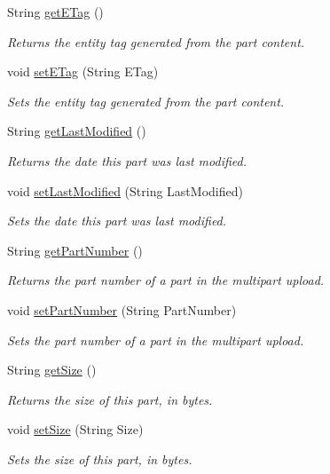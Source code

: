 \begin{DoxyCompactItemize}
\item 
String \hyperlink{classorg_1_1jcs_1_1dss_1_1main_1_1PartSummary_a02242db1df4b063bb74e890017a0542c}{get\+E\+Tag} ()
\begin{DoxyCompactList}\small\item\em Returns the entity tag generated from the part content. \end{DoxyCompactList}\item 
void \hyperlink{classorg_1_1jcs_1_1dss_1_1main_1_1PartSummary_a30882b2d780f87e0925003d497a2e2e0}{set\+E\+Tag} (String E\+Tag)
\begin{DoxyCompactList}\small\item\em Sets the entity tag generated from the part content. \end{DoxyCompactList}\item 
String \hyperlink{classorg_1_1jcs_1_1dss_1_1main_1_1PartSummary_a1688671174df7b92a7244e429004b211}{get\+Last\+Modified} ()
\begin{DoxyCompactList}\small\item\em Returns the date this part was last modified. \end{DoxyCompactList}\item 
void \hyperlink{classorg_1_1jcs_1_1dss_1_1main_1_1PartSummary_a285cc3cbb9df94da270f65543b51fce9}{set\+Last\+Modified} (String Last\+Modified)
\begin{DoxyCompactList}\small\item\em Sets the date this part was last modified. \end{DoxyCompactList}\item 
String \hyperlink{classorg_1_1jcs_1_1dss_1_1main_1_1PartSummary_ad67c10b3a48cbaee701cfb71f3b94b16}{get\+Part\+Number} ()
\begin{DoxyCompactList}\small\item\em Returns the part number of a part in the multipart upload. \end{DoxyCompactList}\item 
void \hyperlink{classorg_1_1jcs_1_1dss_1_1main_1_1PartSummary_a862ffbd749521c759a5122742b6de395}{set\+Part\+Number} (String Part\+Number)
\begin{DoxyCompactList}\small\item\em Sets the part number of a part in the multipart upload. \end{DoxyCompactList}\item 
String \hyperlink{classorg_1_1jcs_1_1dss_1_1main_1_1PartSummary_ad0e537953c477eef5e63c8ae8efe1410}{get\+Size} ()
\begin{DoxyCompactList}\small\item\em Returns the size of this part, in bytes. \end{DoxyCompactList}\item 
void \hyperlink{classorg_1_1jcs_1_1dss_1_1main_1_1PartSummary_a5575082eb9ab00c021001414039409e7}{set\+Size} (String Size)
\begin{DoxyCompactList}\small\item\em Sets the size of this part, in bytes. \end{DoxyCompactList}\end{DoxyCompactItemize}


